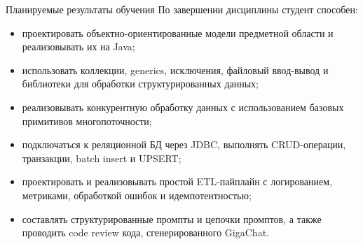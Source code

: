 \documentclass[aspectratio=169,10pt]{beamer}
\begin{document}
\begin{frame}{Планируемые результаты обучения}
\small
По завершении дисциплины студент способен:
\begin{itemize}
  \item проектировать объектно-ориентированные модели предметной области и реализовывать их на Java;
  \item использовать коллекции, generics, исключения, файловый ввод-вывод и библиотеки для обработки структурированных данных;
  \item реализовывать конкурентную обработку данных с использованием базовых примитивов многопоточности;
  \item подключаться к реляционной БД через JDBC, выполнять CRUD-операции, транзакции, batch insert и UPSERT;
  \item проектировать и реализовывать простой ETL-пайплайн с логированием, метриками, обработкой ошибок и идемпотентностью;
  \item составлять структурированные промпты и цепочки промптов, а также проводить code review кода, сгенерированного GigaChat.
\end{itemize}
\end{frame}
\end{document}
